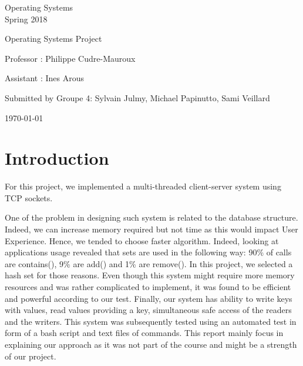 \documentclass[a4paper,11pt]{report}
\begin{document}
    \begin{center}
        \Large{
            Operating Systems\\
            Spring 2018
        }

        \noindent\makebox[\linewidth]{\rule{\linewidth}{0.4pt}}
        Operating Systems Project
        \noindent\makebox[\linewidth]{\rule{\linewidth}{0.4pt}}

        \begin{flushleft}
            Professor : Philippe Cudre-Mauroux

            Assistant : Ines Arous
        \end{flushleft}

        \noindent\makebox[\linewidth]{\rule{\linewidth}{0.4pt}}

        Submitted by Groupe 4: Sylvain Julmy, Michael Papinutto, Sami Veillard

        \noindent\makebox[\linewidth]{\rule{\textwidth}{1pt}}
        \vspace*{0.8cm}
        \today

    \end{center}

    \newpage

    \section*{Introduction}
    For this project, we implemented a multi-threaded client-server system using TCP sockets.

    One of the problem in designing such system is related to the database structure.
    Indeed, we can increase memory required but not time as this would impact User Experience.
    Hence, we tended to choose faster algorithm.
    Indeed, looking at applications usage revealed that sets are used in the following way: 90\% of calls are contains(),
    9\% are add() and 1\% are remove(). In this project, we selected a hash set for those reasons.
    Even though this system might require more memory resources and was rather complicated to implement, it was found to
    be efficient and powerful according to our test. Finally, our system has ability to write keys with values, read values
    providing a key, simultaneous safe access of the readers and the writers. This system was subsequently tested using
    an automated test in form of a bash script and text files of commands. This report mainly focus in explaining our
    approach as it was not part of the course and might be a strength of our project.
\end{document}
